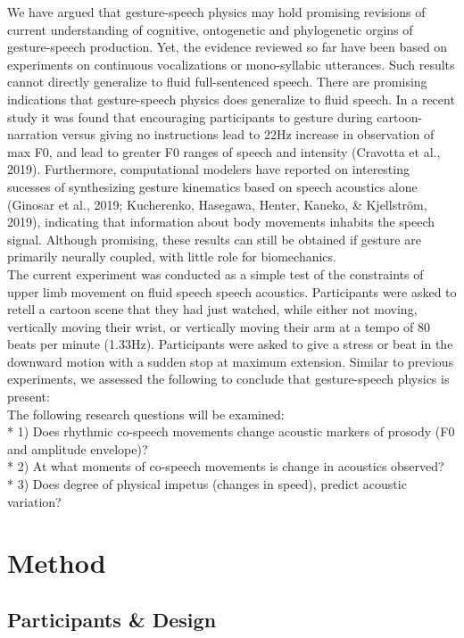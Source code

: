 \documentclass[
  man,floatsintext]{apa6}
\begin{document}
We have argued that gesture-speech physics may hold promising revisions of current understanding of cognitive, ontogenetic and phylogenetic orgins of gesture-speech production. Yet, the evidence reviewed so far have been based on experiments on continuous vocalizations or mono-syllabic utterances. Such results cannot directly generalize to fluid full-sentenced speech. There are promising indications that gesture-speech physics does generalize to fluid speech. In a recent study it was found that encouraging participants to gesture during cartoon-narration versus giving no instructions lead to 22Hz increase in observation of max F0, and lead to greater F0 ranges of speech and intensity (Cravotta et al., 2019). Furthermore, computational modelers have reported on interesting sucesses of synthesizing gesture kinematics based on speech acoustics alone (Ginosar et al., 2019; Kucherenko, Hasegawa, Henter, Kaneko, \& Kjellström, 2019), indicating that information about body movements inhabits the speech signal. Although promising, these results can still be obtained if gesture are primarily neurally coupled, with little role for biomechanics.\\
The current experiment was conducted as a simple test of the constraints of upper limb movement on fluid speech speech acoustics. Participants were asked to retell a cartoon scene that they had just watched, while either not moving, vertically moving their wrist, or vertically moving their arm at a tempo of 80 beats per minute (1.33Hz). Participants were asked to give a stress or beat in the downward motion with a sudden stop at maximum extension. Similar to previous experiments, we assessed the following to conclude that gesture-speech physics is present:\\
The following research questions will be examined:\\
* 1) Does rhythmic co-speech movements change acoustic markers of prosody (F0 and amplitude envelope)?\\
* 2) At what moments of co-speech movements is change in acoustics observed?\\
* 3) Does degree of physical impetus (changes in speed), predict acoustic variation?

\pagebreak

\hypertarget{method}{%
\section{Method}\label{method}}

\hypertarget{participants-design}{%
\subsection{Participants \& Design}\label{participants-design}}
\end{document}
